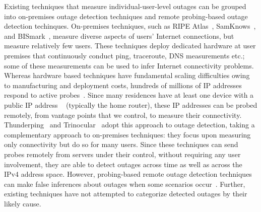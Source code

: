 Existing techniques that measure individual-user-level outages can be
grouped into on-premises outage detection techniques and remote probing-based
outage detection techinques. On-premises techniques, such as
RIPE Atlas~\cite{atlas}, SamKnows~\cite{samknows}, and
BISmark~\cite{bismark-main-bib}, measure diverse aspects of
users' Internet connections, but
measure relatively few users. These techniques 
deploy dedicated hardware at user premises that continuously conduct ping,
traceroute, DNS measurements etc.; some of these
measurements can be used to infer Internet connectivity problems. Whereas hardware
based techniques have fundamental scaling difficulties owing to
manufacturing and deployment costs, hundreds of millions of
IP addresses respond to active probes~\cite{timeouts}. Since many
residences have at least one device with a public IP address ~\cite{cgn-imc16}
(typically the home router), these IP addresses can be probed
remotely, from 
vantage points that we control, to measure their connectivity. Thunderping~\cite{pingin} and Trinocular~\cite{trinocular} adopt this
approach to outage detection, taking a
complementary approach to on-premises techniques: they focus upon
measuring only connectivity but do so for many users. Since these
techniques can send probes remotely from servers under their control, without requiring any user
involvement, they are able to detect outages across time
as well as across the IPv4 address space.
However, probing-based remote outage detection techniques can
make false inferences about outages when some scenarios
occur~\cite{timeouts, addrchange-reasons}. Further, existing
techniques have not 
attempted to categorize detected outages by their likely cause.
 

